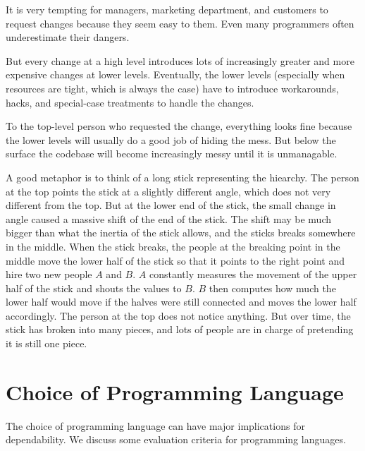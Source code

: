It is very tempting for managers, marketing department, and customers to request changes because they seem easy to them.
Even many programmers often underestimate their dangers.

But every change at a high level introduces lots of increasingly greater and more expensive changes at lower levels.
Eventually, the lower levels (especially when resources are tight, which is always the case) have to introduce workarounds, hacks, and special-case treatments to handle the changes.

To the top-level person who requested the change, everything looks fine because the lower levels will usually do a good job of hiding the mess.
But below the surface the codebase will become increasingly messy until it is unmanagable.

A good metaphor is to think of a long stick representing the hiearchy.
The person at the top points the stick at a slightly different angle, which does not very different from the top.
But at the lower end of the stick, the small change in angle caused a massive shift of the end of the stick.
The shift may be much bigger than what the inertia of the stick allows, and the sticks breaks somewhere in the middle.
When the stick breaks, the people at the breaking point in the middle move the lower half of the stick so that it points to the right point and hire two new people $A$ and $B$.
$A$ constantly measures the movement of the upper half of the stick and shouts the values to $B$.
$B$ then computes how much the lower half would move if the halves were still connected and moves the lower half accordingly.
The person at the top does not notice anything.
But over time, the stick has broken into many pieces, and lots of people are in charge of pretending it is still one piece.


\section{Choice of Programming Language}

The choice of programming language can have major implications for dependability.
We discuss some evaluation criteria for programming languages.

